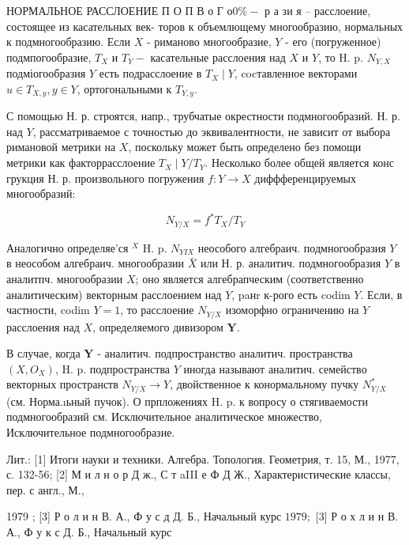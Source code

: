 \documentclass[10pt]{article}
\begin{document}
НОРМАЛЬНОЕ РАССЛОЕНИЕ П О П В $о$ Г $о 0 \%-$ р а зи я -- расслоение, состоящее из касательных век- торов к объемлющему многообразию, нормальных к подмногообразию. Если $X$ - риманово многообразие, $Y$ - его (погруженное) подмпогообразие, $T_{X}$ и $T_{Y}-$ касательные расслоения над $X$ и $Y$, то H. p. $N_{Y, X}$ подміогообразия $Y$ есть подрасслоение в $T_{X} \mid Y$, cocтавленное векторами $u \in T_{X, y}, y \in Y$, ортогональными к $T_{Y, y}$.



С помощью Н. р. строятся, напр., трубчатые окрестности подмногообразий. Н. р. над $Y$, рассматриваемое с точностью до эквивалентности, не зависит от выбора римановой метрики на $X$, поскольку может быть определено без помощи метрики как факторрасслоение $T_{X} \mid Y / T_{Y}$. Несколько более общей является конс грукция Н. р. произвольного погружения $f: Y \rightarrow X$ диффференцируемых многообразий:



\[

N_{Y / X}=f^{*} T_{X} / T_{Y}

\]



Аналогично определяе'ся ${ }^{X}$ H. p. $N_{Y I X}$ неособого алгебраич. подмногообразия $Y$ в неособом алгебраич. многообразии $\bar{X}$ или Н. р. аналитич. подмногообразия $Y$ в аналитпч. многообразии $X$; оно является алгебрапческим (соответственно аналитическим) векторным расслоением над $Y$, paнr к-рого есть codim $Y$. Если, в частности, codim $Y=1$, то расслоение $N_{Y / X}$ изоморфно ограничению на $Y$ расслоения над $X$, определяемого дивизором $\boldsymbol{Y}$.



В случае, когда $\boldsymbol{Y}$ - аналитич. подпространство аналитич. пространства $\left(X, O_{X}\right)$, H. p. подпространства $Y$ иногда называют аналитич. семейство векторных пространств $N_{Y / X} \rightarrow Y$, двойственное к конормальному пучку $N_{Y / X}^{*}$ (см. Норма.ıьный пучок). О прпложениях H. p. к вопросу о стягиваемости подмногообразий см. Исключительное аналитическое множество, Исключительное подмногообразие.



Лит.: [1] Итоги науки и техники. Алгебра. Топология. Геометрия, т. 15, М., 1977, с. 132-56; [2] М и л н о р Д ж., С т aIII е Ф Д Ж., Характеристические классы, пер. с англ., М.,

1979 ; [3] Р о л и н В. А., Ф у с д Д. Б., Начальный курс $1979 ;$ [3] Р о х л и н В. А., Ф у к с Д. Б., Начальный курс
\end{document}
